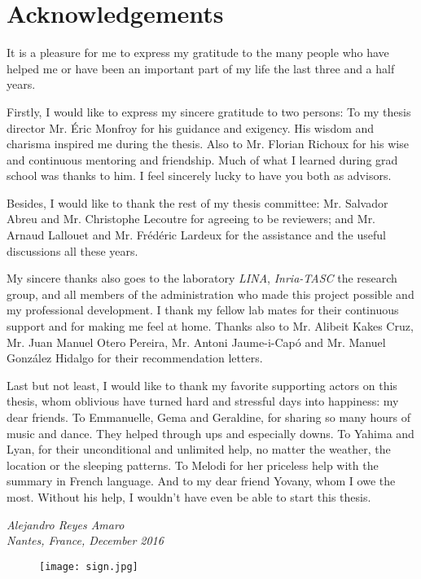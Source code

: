 \cleardoublepage
\chapter{Acknowledgements}
\vspace*{1cm}
It is a pleasure for me to express my gratitude to the many people who have helped me or have been an important part of my life the last three and a half years.

Firstly, I would like to express my sincere gratitude to two persons: To my thesis director Mr. Éric {\sc Monfroy} for his guidance and exigency. His wisdom and charisma inspired me during the thesis. Also to Mr. Florian {\sc Richoux} for his wise and continuous mentoring and friendship. Much of what I learned during grad school was thanks to him. I feel sincerely lucky to have you both as advisors.

Besides, I would like to thank the rest of my thesis committee: Mr. Salvador {\sc Abreu} and Mr. Christophe {\sc Lecoutre} for agreeing to be reviewers; and Mr. Arnaud {\sc Lallouet} and Mr. Frédéric {\sc Lardeux} for the assistance and the useful discussions all these years.

My sincere thanks also goes to the laboratory \emph{LINA}, \emph{Inria-TASC} the research group, and all members of the administration who made this project possible and my professional development. I thank my fellow lab mates for their continuous support and for making me feel at home. Thanks also to Mr. Alibeit {\sc Kakes Cruz}, Mr. Juan Manuel {\sc Otero Pereira}, Mr. Antoni {\sc Jaume-i-Capó} and Mr. Manuel {\sc González Hidalgo} for their recommendation letters.

Last but not least, I would like to thank my favorite supporting actors on this thesis, whom oblivious have turned hard and stressful days into happiness: my dear friends. To Emmanuelle, Gema and Geraldine, for sharing so many hours of music and dance. They helped through ups and especially downs. To Yahima and Lyan, for their unconditional and unlimited help, no matter the weather, the location or the sleeping patterns. To Melodi for her priceless help with the summary in French language. And to my dear friend Yovany, whom I owe the most. Without his help, I wouldn't have even be able to start this thesis.


\vspace*{1cm}
\begin{center}
\emph{
Alejandro {\sc Reyes Amaro}\\
\vspace*{0.1 cm}
Nantes, France, December 2016}
\begin{figure}[!h]
\centering
\texttt{[image: sign.jpg]}
\end{figure}
\end{center}
